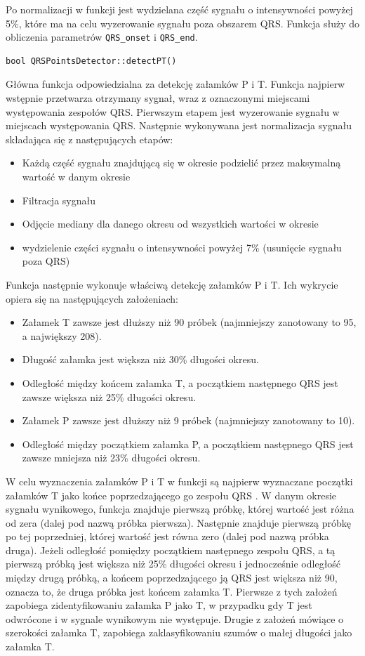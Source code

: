 \documentclass[a4paper, 11pt]{article}
\begin{document}
Po normalizacji w funkcji jest wydzielana część sygnału o intensywności powyżej 5\%, które ma na
celu wyzerowanie sygnału poza obszarem QRS. Funkcja służy do obliczenia parametrów \verb|QRS_onset| i
\verb|QRS_end|.

\begin{lstlisting}
bool QRSPointsDetector::detectPT()
\end{lstlisting}

Główna funkcja odpowiedzialna za detekcję załamków P i T. Funkcja najpierw wstępnie przetwarza
otrzymany sygnał, wraz z oznaczonymi miejscami występowania zespołów QRS. Pierwszym etapem jest
wyzerowanie sygnału w miejscach występowania QRS. Następnie wykonywana jest normalizacja sygnału
składająca się z następujących etapów:
\begin{itemize}
     \item Każdą część sygnału znajdującą się w okresie podzielić przez maksymalną wartość w danym okresie
     \item Filtracja sygnału
     \item Odjęcie mediany dla danego okresu od wszystkich wartości w okresie
     \item wydzielenie części sygnału o intensywności powyżej 7\% (usunięcie sygnału poza
QRS)
\end{itemize}

Funkcja następnie wykonuje właściwą detekcję załamków P i T. Ich wykrycie opiera się na następujących
założeniach:
\begin{itemize}
     \item Załamek T zawsze jest dłuższy niż 90 próbek (najmniejszy zanotowany to 95, a
największy 208).
     \item Długość załamka jest większa niż 30\% długości okresu.
     \item Odległość między końcem załamka T, a początkiem następnego QRS jest zawsze
większa niż 25\% długości okresu.
     \item Załamek P zawsze jest dłuższy niż 9 próbek (najmniejszy zanotowany to 10).
     \item Odległość między początkiem załamka P, a początkiem następnego QRS jest
zawsze mniejsza niż 23\% długości okresu.
\end{itemize}

W celu wyznaczenia załamków P i T w funkcji są najpierw wyznaczane początki załamków T jako
końce poprzedzającego go zespołu QRS . W danym okresie sygnału wynikowego, funkcja znajduje
pierwszą próbkę, której wartość jest różna od zera (dalej pod nazwą próbka pierwsza). Następnie
znajduje pierwszą próbkę po tej poprzedniej, której wartość jest równa zero (dalej pod nazwą próbka
druga). Jeżeli odległość pomiędzy początkiem następnego zespołu QRS, a tą pierwszą próbką
jest większa niż 25\% długości okresu i jednocześnie odległość między drugą próbką, a końcem
poprzedzającego ją QRS jest większa niż 90, oznacza to, że druga próbka jest końcem załamka T.
Pierwsze z tych założeń zapobiega zidentyfikowaniu załamka P jako T, w przypadku gdy T jest
odwrócone i w sygnale wynikowym nie występuje. Drugie z założeń mówiące o szerokości załamka
T, zapobiega zaklasyfikowaniu szumów o małej długości jako załamka T.
\end{document}
